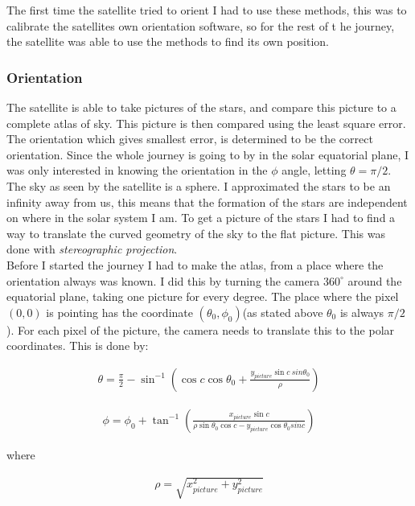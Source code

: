 \documentclass[a4paper, 10pt]{article}
\begin{document}
The first time the satellite tried to orient I had to use these methods, this was to calibrate the satellites own orientation software, so for the rest of t he journey, the satellite was able to use the methods to find its own position.

\subsubsection{Orientation}
The satellite is able to take pictures of the stars, and compare this picture to a complete atlas of sky. This picture is then compared using the least square error. The orientation which gives smallest error, is determined to be the correct orientation. Since the whole journey is going to by in the solar equatorial plane, I was only interested in knowing the orientation in the $\phi$ angle, letting $\theta = \pi /2$.\\

The sky as seen by the satellite is a sphere. I approximated the stars to be an infinity away from us, this means that the formation of the stars are independent on where in the solar system I am. To get a picture of the stars I had to find a way to translate the curved geometry of the sky to the flat picture. This was done with \textit{stereographic projection}\cite{part4}.\\

Before I started the journey I had to make the atlas, from a place where the orientation always was known. I did this by turning the camera $360^\circ$ around the equatorial plane, taking one picture for every degree. The place where the pixel $(0,0)$ is pointing has the coordinate $(\theta_0,\phi_0)$(as stated above $\theta_0$ is always $\pi/2$). For each pixel of the picture, the camera needs to translate this to the polar coordinates. This is done by: 

\begin{align}
\theta = \frac{\pi}{2} - \sin^{-1}\left( \cos c \cos \theta_0 + \frac{y_{picture}\sin c\ sin \theta_0}{\rho} \right)
\end{align}

\begin{align}
\phi = \phi_0 + \tan^{-1} \left( \frac{x_{picture}\sin c}{\rho \sin \theta_0 \cos c - y_{picture}\cos \theta_0 sin c} \right)
\end{align}

where 

\begin{align}
\rho = \sqrt{x_{picture}^2 + y_{picture}^2}
\end{align}
\end{document}
